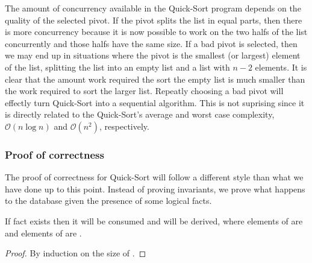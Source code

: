 The amount of concurrency available in the Quick-Sort program depends on the
quality of the selected pivot. If the pivot splits the list in equal parts, then
there is more concurrency because it is now possible to work on the two halfs of
the list concurrently and those halfs have the same size. If a bad pivot is
selected, then we may end up in situations where the pivot is the smallest (or
largest) element of the list, splitting the list into an empty list and a list
with $n-2$ elements. It is clear that the amount work required the sort the
empty list is much smaller than the work required to sort the larger list.
Repeatly choosing a bad pivot will effectly turn Quick-Sort into a sequential
algorithm. This is not suprising since it is directly related to the
Quick-Sort's average and worst case complexity, $\mathcal{O}(n \log{n})$ and
$\mathcal{O}(n^2)$, respectively.

\subsubsection{Proof of correctness}

The proof of correctness for Quick-Sort will follow a different style than what
we have done up to this point. Instead of proving invariants, we prove what
happens to the database given the presence of some logical facts.

\begin{lemma}

If fact  exists then it will be consumed
and  will be
derived, where elements of  are \code{<=}  and elements
of  are .

\end{lemma}
\begin{proof}
By induction on the size of .
\end{proof}

